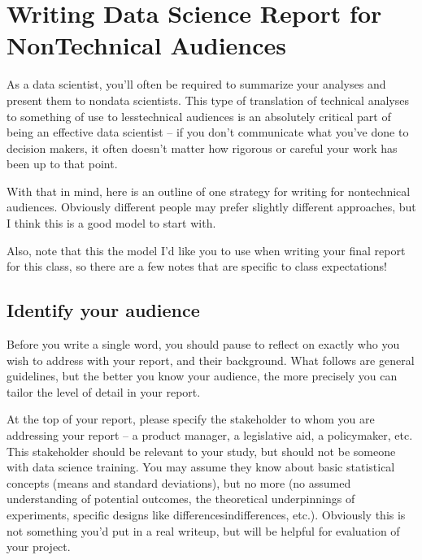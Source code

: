 \documentclass[letterpaper,10pt,english]{jupyterBook}
\begin{document}
\sphinxstepscope


\chapter{Writing Data Science Report for Non\sphinxhyphen{}Technical Audiences}
\label{\detokenize{40_in_practice/25_writing_to_stakeholders:writing-data-science-report-for-non-technical-audiences}}\label{\detokenize{40_in_practice/25_writing_to_stakeholders::doc}}
\sphinxAtStartPar
As a data scientist, you’ll often be required to summarize your analyses and present them to non\sphinxhyphen{}data scientists. This type of translation of technical analyses to something of use to less\sphinxhyphen{}technical audiences is an absolutely critical part of being an effective data scientist – if you don’t communicate what you’ve done to decision makers, it often doesn’t matter how rigorous or careful your work has been up to that point.

\sphinxAtStartPar
With that in mind, here is an outline of one strategy for writing for non\sphinxhyphen{}technical audiences. Obviously different people may prefer slightly different approaches, but I think this is a good model to start with.

\sphinxAtStartPar
Also, note that this  the model I’d like you to use when writing your final report for this class, so there are a few notes that are specific to class expectations!


\section{Identify your audience}
\label{\detokenize{40_in_practice/25_writing_to_stakeholders:identify-your-audience}}
\sphinxAtStartPar
Before you write a single word, you should pause to reflect on exactly who you wish to address with your report, and their background. What follows are general guidelines, but the better you know your audience, the more precisely you can tailor the level of detail in your report.

\sphinxAtStartPar
{} At the top of your report, please specify the stakeholder to whom you are addressing your report – a product manager, a legislative aid, a policymaker, etc. This stakeholder should be relevant to your study, but should not be someone with data science training. You may assume they know about basic statistical concepts (means and standard deviations), but no more (no assumed understanding of potential outcomes, the theoretical underpinnings of experiments, specific designs like differences\sphinxhyphen{}in\sphinxhyphen{}differences, etc.). Obviously this is not something you’d put in a real write\sphinxhyphen{}up, but will be helpful for evaluation of your project.
\end{document}
